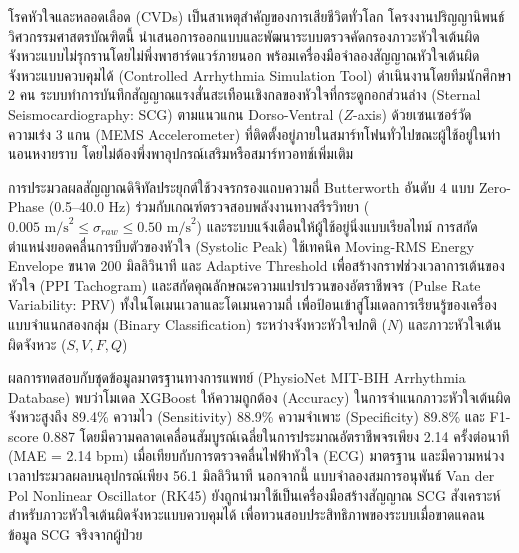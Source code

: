 โรคหัวใจและหลอดเลือด (CVDs) เป็นสาเหตุสำคัญของการเสียชีวิตทั่วโลก โครงงานปริญญานิพนธ์วิศวกรรมศาสตรบัณฑิตนี้ นำเสนอการออกแบบและพัฒนาระบบตรวจคัดกรองภาวะหัวใจเต้นผิดจังหวะแบบไม่รุกรานโดยไม่พึ่งพาฮาร์ดแวร์ภายนอก พร้อมเครื่องมือจำลองสัญญาณหัวใจเต้นผิดจังหวะแบบควบคุมได้ (Controlled Arrhythmia Simulation Tool) ดำเนินงานโดยทีมนักศึกษา 2 คน ระบบทำการบันทึกสัญญาณแรงสั่นสะเทือนเชิงกลของหัวใจที่กระดูกอกส่วนล่าง (Sternal Seismocardiography: SCG) ตามแนวแกน Dorso-Ventral ($Z$-axis) ด้วยเซนเซอร์วัดความเร่ง 3 แกน (MEMS Accelerometer) ที่ติดตั้งอยู่ภายในสมาร์ทโฟนทั่วไปขณะผู้ใช้อยู่ในท่านอนหงายราบ โดยไม่ต้องพึ่งพาอุปกรณ์เสริมหรือสมาร์ทวอทช์เพิ่มเติม

การประมวลผลสัญญาณดิจิทัลประยุกต์ใช้วงจรกรองแถบความถี่ Butterworth อันดับ 4 แบบ Zero-Phase (0.5--40.0 Hz) ร่วมกับเกณฑ์ตรวจสอบพลังงานทางสรีรวิทยา ($0.005\text{ m/s}^2 \le \sigma_{raw} \le 0.50\text{ m/s}^2$) และระบบแจ้งเตือนให้ผู้ใช้อยู่นิ่งแบบเรียลไทม์ การสกัดตำแหน่งยอดคลื่นการบีบตัวของหัวใจ (Systolic Peak) ใช้เทคนิค Moving-RMS Energy Envelope ขนาด 200 มิลลิวินาที และ Adaptive Threshold เพื่อสร้างกราฟช่วงเวลาการเต้นของหัวใจ (PPI Tachogram) และสกัดคุณลักษณะความแปรปรวนของอัตราชีพจร (Pulse Rate Variability: PRV) ทั้งในโดเมนเวลาและโดเมนความถี่ เพื่อป้อนเข้าสู่โมเดลการเรียนรู้ของเครื่องแบบจำแนกสองกลุ่ม (Binary Classification) ระหว่างจังหวะหัวใจปกติ ($N$) และภาวะหัวใจเต้นผิดจังหวะ ($S, V, F, Q$)

ผลการทดสอบกับชุดข้อมูลมาตรฐานทางการแพทย์ (PhysioNet MIT-BIH Arrhythmia Database) พบว่าโมเดล XGBoost ให้ความถูกต้อง (Accuracy) ในการจำแนกภาวะหัวใจเต้นผิดจังหวะสูงถึง 89.4\% ความไว (Sensitivity) 88.9\% ความจำเพาะ (Specificity) 89.8\% และ F1-score 0.887 โดยมีความคลาดเคลื่อนสัมบูรณ์เฉลี่ยในการประมาณอัตราชีพจรเพียง 2.14 ครั้งต่อนาที (MAE = 2.14 bpm) เมื่อเทียบกับการตรวจคลื่นไฟฟ้าหัวใจ (ECG) มาตรฐาน และมีความหน่วงเวลาประมวลผลบนอุปกรณ์เพียง 56.1 มิลลิวินาที นอกจากนี้ แบบจำลองสมการอนุพันธ์ Van der Pol Nonlinear Oscillator (RK45) ยังถูกนำมาใช้เป็นเครื่องมือสร้างสัญญาณ SCG สังเคราะห์สำหรับภาวะหัวใจเต้นผิดจังหวะแบบควบคุมได้ เพื่อทวนสอบประสิทธิภาพของระบบเมื่อขาดแคลนข้อมูล SCG จริงจากผู้ป่วย
